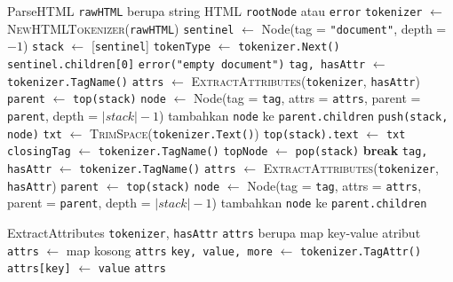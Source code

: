 \begin{ieeealgorithm}{ParseHTML}
    \Require \texttt{rawHTML} berupa string HTML
    \Ensure \texttt{rootNode} atau \texttt{error}
    \State \texttt{tokenizer} $\gets$ \textsc{NewHTMLTokenizer}(\texttt{rawHTML})
    \State \texttt{sentinel} $\gets$ Node(tag = \texttt{"document"}, depth = $-1$)
    \State \texttt{stack} $\gets$ [\texttt{sentinel}]
    \State \texttt{tokenType} $\gets$ \texttt{tokenizer.Next()}
    \State \Return \texttt{sentinel.children[0]}
    \Else
    \State \Return \texttt{error("empty document")}
    \EndIf
    \EndIf
    \State \texttt{tag, hasAttr} $\gets$ \texttt{tokenizer.TagName()}
    \State \texttt{attrs} $\gets$ \textsc{ExtractAttributes}(\texttt{tokenizer}, \texttt{hasAttr})
    \State \texttt{parent} $\gets$ \texttt{top(stack)}
    \State \texttt{node} $\gets$ Node(tag = \texttt{tag}, attrs = \texttt{attrs}, parent = \texttt{parent}, depth = $|stack|-1$)
    \State tambahkan \texttt{node} ke \texttt{parent.children}
    \State \texttt{push(stack, node)}
    \EndIf
    \State \texttt{txt} $\gets$ \textsc{TrimSpace}(\texttt{tokenizer.Text()})
    \State \texttt{top(stack).text} $\gets$ \texttt{txt}
    \EndIf
    \State \texttt{closingTag} $\gets$ \texttt{tokenizer.TagName()}
    \State \texttt{topNode} $\gets$ \texttt{pop(stack)}
    \State \textbf{break}
    \EndIf
    \EndWhile
    \State \texttt{tag, hasAttr} $\gets$ \texttt{tokenizer.TagName()}
    \State \texttt{attrs} $\gets$ \textsc{ExtractAttributes}(\texttt{tokenizer}, \texttt{hasAttr})
    \State \texttt{parent} $\gets$ \texttt{top(stack)}
    \State \texttt{node} $\gets$ Node(tag = \texttt{tag}, attrs = \texttt{attrs}, parent = \texttt{parent}, depth = $|stack|-1$)
    \State tambahkan \texttt{node} ke \texttt{parent.children}
    \EndIf
    \EndWhile
\end{ieeealgorithm}

\begin{ieeealgorithm}{ExtractAttributes}
    \Require \texttt{tokenizer}, \texttt{hasAttr}
    \Ensure \texttt{attrs} berupa map key-value atribut
    \State \texttt{attrs} $\gets$ map kosong
    \State \Return \texttt{attrs}
    \EndIf
    \Repeat
    \State \texttt{key, value, more} $\gets$ \texttt{tokenizer.TagAttr()}
    \State \texttt{attrs[key]} $\gets$ \texttt{value}
    \State \Return \texttt{attrs}
\end{ieeealgorithm}

